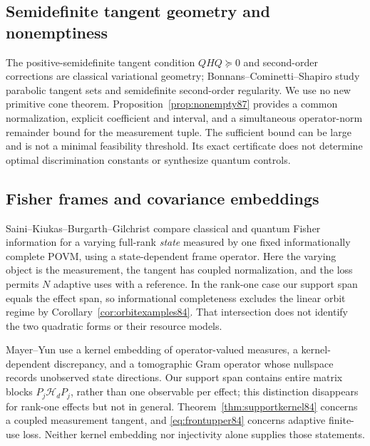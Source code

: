 \subsection{Semidefinite tangent geometry and nonemptiness}
The positive-semidefinite tangent condition $QHQ\succeq0$ and
second-order corrections are classical variational geometry;
Bonnans--Cominetti--Shapiro \cite{BCS87} study parabolic tangent
sets and semidefinite second-order regularity.  We use no new
primitive cone theorem.  Proposition~\ref{prop:nonempty87}
provides a common normalization, explicit coefficient and interval,
and a simultaneous operator-norm remainder bound for the measurement
tuple.  The sufficient bound can be large and is not a minimal
feasibility threshold.  Its exact certificate does not determine
optimal discrimination constants or synthesize quantum controls.

\subsection{Fisher frames and covariance embeddings}
Saini--Kiukas--Burgarth--Gilchrist \cite[Theorem~1]{SKBG84} compare
classical and quantum Fisher information for a varying full-rank
\emph{state} measured by one fixed informationally complete POVM,
using a state-dependent frame operator.  Here the varying object
is the measurement, the tangent has coupled normalization, and the
loss permits $N$ adaptive uses with a reference.  In the rank-one
case our support span equals the effect span, so informational
completeness excludes the linear orbit regime by
Corollary~\ref{cor:orbitexamples84}.  That intersection does not
identify the two quadratic forms or their resource models.

Mayer--Yun \cite[Theorem~3.6, Definition~3.7 and Remark~4.4]{MY84}
use a kernel embedding of operator-valued measures, a kernel-dependent
discrepancy, and a tomographic Gram operator whose nullspace records
unobserved state directions.  Our support span contains entire
matrix blocks $P_j\mathcal H_dP_j$, rather than one observable
per effect; this distinction disappears for rank-one effects but
not in general.  Theorem~\ref{thm:supportkernel84} concerns a
coupled measurement tangent, and \eqref{eq:frontupper84} concerns
adaptive finite-use loss.  Neither kernel embedding nor injectivity
alone supplies those statements.

